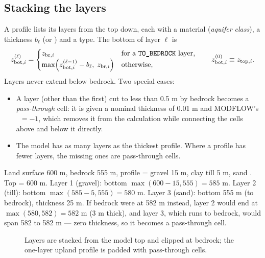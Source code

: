 \subsection{Stacking the layers}
A profile lists its layers from the top down, each with a material (\emph{aquifer class}), a thickness $b_\ell$ (or
) and a type. The bottom of layer $\ell$ is
\begin{equation}
z^{(\ell)}_{\mathrm{bot},i}=
\begin{cases}
z_{\mathrm{br},i} & \text{for a \cmd{TO\_BEDROCK} layer,}\\
\max\!\left(z^{(\ell-1)}_{\mathrm{bot},i}-b_\ell,\;z_{\mathrm{br},i}\right) & \text{otherwise,}
\end{cases}
\qquad z^{(0)}_{\mathrm{bot},i}\equiv z_{\mathrm{top},i}.
\end{equation}
Layers never extend below bedrock. Two special cases:
\begin{itemize}
\item A layer (other than the first) cut to less than 0.5 m by bedrock becomes a \emph{pass-through} cell: it is given
a nominal thickness of 0.01 m and MODFLOW's ~$=-1$, which removes it from the calculation while
connecting the cells above and below it directly.
\item The model has as many layers as the thickest profile. Where a profile has fewer layers, the missing ones are
pass-through cells.
\end{itemize}

\begin{example}
Land surface 600 m, bedrock 555 m, profile  = gravel 15 m, clay till 5 m, sand .
Top = 600 m. Layer 1 (gravel): bottom $\max(600-15,555)=585$ m. Layer 2 (till): bottom $\max(585-5,555)=580$ m.
Layer 3 (sand): bottom 555 m (to bedrock), thickness 25 m. If bedrock were at 582 m instead, layer 2 would end at
$\max(580,582)=582$ m (3 m thick), and layer 3, which runs to bedrock, would span 582 to 582 m --- zero thickness, so it becomes
a pass-through cell.
\end{example}

\begin{figure}[!htbp]\centering

\caption{Layers are stacked from the model top and clipped at bedrock; the one-layer upland profile is padded with
pass-through cells.}\label{fig:layers}
\end{figure}

